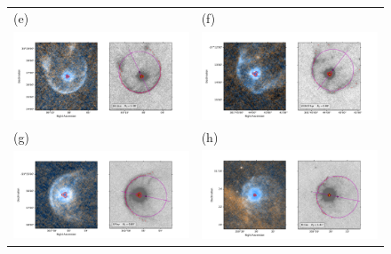 \begin{figure}
\begin{tabular}{@{}ll@{}}
    (e) & (f) \\
    \includegraphics[trim=10 0 60 30, clip]{figs/uuaur-imageplot}
    & \includegraphics[trim=10 0 60 30, clip]{figs/v1943sgr-imageplot}\\
    (g) & (h) \\
    \includegraphics[trim=10 0 60 30, clip]{figs/xpav-imageplot}
    & \includegraphics[trim=10 0 60 30, clip]{figs/rcas-imageplot}

\end{tabular}
\end{figure}
